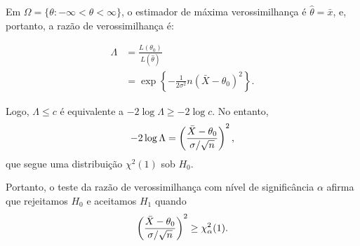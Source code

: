 \documentclass[12pt]{beamer}
\begin{document}
\begin{frame}{}
\begin{block}{}
\justifying
Em $\Omega = \{\theta : -\infty < \theta < \infty\}$, o estimador de máxima verossimilhança é $\hat{\theta} = \bar{x}$, e, portanto, a razão de verossimilhança é:

\[
\begin{aligned}
\Lambda &= \frac{L(\theta_0)}{L(\hat{\theta})} \\
&= \exp\left\{ -\frac{1}{2\sigma^2}n(\bar{X} - \theta_0)^2 \right\}.
\end{aligned}
\]
\end{block}
\pause
\begin{block}{}
\justifying
Logo, $\Lambda \leq c$ é equivalente a $-2 \log \Lambda \geq -2 \log c$. No entanto, 
\[
-2 \log \Lambda = \left(\frac{\Bar{X} - \theta_0}{\sigma/\sqrt{n}}\right)^{2},
\]
que segue uma distribuição $\chi^2(1)$ sob $H_0$. 
\end{block}
\end{frame}


\begin{frame}{}
\begin{block}{}
\justifying
Portanto, o teste da razão de verossimilhança com nível de significância $\alpha$ afirma que rejeitamos $H_0$ e aceitamos $H_1$ quando
\[
\left(\frac{\Bar{X} - \theta_0}{\sigma/\sqrt{n}}\right)^{2} \geq \chi^2_\alpha(1).
\]

\end{block}
\end{frame}
\end{document}
